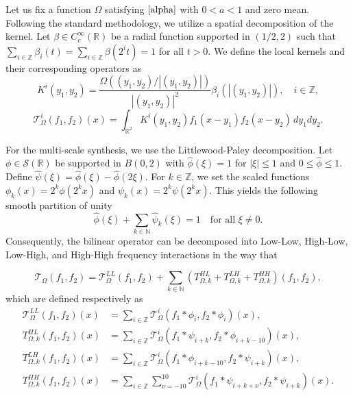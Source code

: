 \documentclass[11pt]{amsart}
\begin{document}
Let us fix a function \( \Omega \) satisfying \( \eqref{alpha} \) with \( 0 < a < 1 \) and zero mean. Following the standard methodology, we utilize a spatial decomposition of the kernel. Let \( \beta \in C_c^\infty(\mathbb{R}) \) be a radial function supported in \( (1/2, 2) \) such that \( \sum_{i \in \mathbb{Z}} \beta_i(t) = \sum_{i \in \mathbb{Z}} \beta(2^i t) = 1 \) for all \( t > 0 \). We define the local kernels and their corresponding operators as
\begin{equation}\label{local_op}
	K^i(y_1, y_2) = \frac{\Omega((y_1, y_2)/|(y_1, y_2)|)}{|(y_1, y_2)|^{2}} \beta_i(|(y_1, y_2)|), \quad i \in \mathbb{Z},
\end{equation}
\[
\mathcal {T}_\Omega^i(f_1, f_2)(x) = \int_{\mathbb{R}^2} K^i(y_1, y_2) f_1(x - y_1) f_2(x - y_2) \, dy_1 dy_2.
\]

For the multi-scale synthesis, we use the Littlewood-Paley decomposition. Let \( \phi \in \mathcal{S}(\mathbb{R}) \) be supported in \( B(0, 2) \) with \( \widehat{\phi}(\xi) = 1 \) for \( |\xi| \le 1 \) and $ 0 \le \widehat{\phi} \le 1$. Define \( \widehat{\psi}(\xi) = \widehat{\phi}(\xi) - \widehat{\phi}(2\xi) \). For $k \in \mathbb{Z}$, we set the scaled functions $\phi_k(x) = 2^k \phi(2^k x)$ and $\psi_k(x) = 2^k \psi(2^k x)$. This yields the following smooth partition of unity
$$\widehat{\phi}(\xi) + \sum_{k \in \mathbb{N}} \widehat{\psi}_k(\xi) = 1 \quad \text{for all } \xi \neq 0.$$
Consequently, the bilinear operator can be decomposed into Low-Low, High-Low, Low-High, and High-High frequency interactions in the way that

\begin{equation}\label{decomp_main}
	\mathcal {T}_\Omega(f_1, f_2) = \mathcal {T}_\Omega^{LL}(f_1, f_2) + \sum_{k \in \mathbb{N}} \left( T_{\Omega, k}^{HL} + T_{\Omega, k}^{LH} + T_{\Omega, k}^{HH} \right)(f_1, f_2),
\end{equation}
which are defined respectively as
\begin{align*}
	\mathcal {T}_\Omega^{LL}(f_1, f_2)(x) &= \sum_{i \in \mathbb{Z}} \mathcal {T}_\Omega^i(f_1 * \phi_i, f_2 * \phi_i)(x), \\
	T_{\Omega, k}^{HL}(f_1, f_2)(x) &= \sum_{i \in \mathbb{Z}} \mathcal {T}_\Omega^i(f_1 * \psi_{i+k}, f_2 * \phi_{i+k-10})(x), \\
	T_{\Omega, k}^{LH}(f_1, f_2)(x) &= \sum_{i \in \mathbb{Z}} \mathcal {T}_\Omega^i(f_1 * \phi_{i+k-10}, f_2 * \psi_{i+k})(x), \\
	T_{\Omega, k}^{HH}(f_1, f_2)(x) &= \sum_{i \in \mathbb{Z}} \sum_{\nu=-10}^{10} \mathcal {T}_\Omega^i(f_1 * \psi_{i+k+\nu}, f_2 * \psi_{i+k})(x).
\end{align*}
\end{document}

